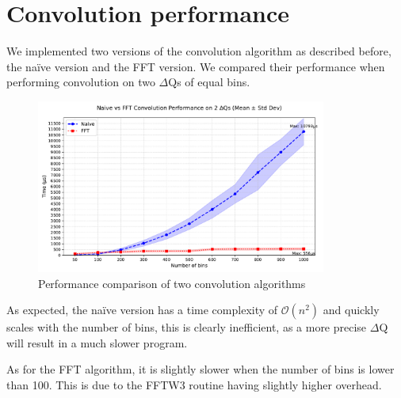 \section{Convolution performance}
    We implemented two versions of the convolution algorithm as described before, the naïve version and the FFT version. We compared their performance when performing convolution on two $\Delta$Qs of equal bins.
    \begin{figure}[H]
        \begin{center}
            \includegraphics[width=0.85\textwidth]{img/conv_perf.pdf}
        \end{center}
        \caption{Performance comparison of two convolution algorithms}\label{fig:conv_perf}
    \end{figure}

    As expected, the naïve version has a time complexity of $\mathcal{O}(n^2)$ and quickly scales with the number of bins, this is clearly inefficient, as a more precise $\Delta$Q will result in a much slower program.

As for the FFT algorithm, it is slightly slower when the number of bins is lower than 100. This is due to the FFTW3 routine having slightly higher overhead.
